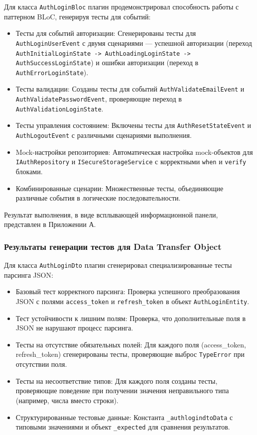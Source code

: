 \documentclass[14pt, russian]{scrartcl}
\begin{document}
Для класса \texttt{AuthLoginBloc} плагин продемонстрировал способность работы с паттерном BLoC, генерируя тесты для событий:

\begin{itemize}
    \item Тесты для событий авторизации: Сгенерированы тесты для \texttt{AuthLoginUserEvent} с двумя сценариями — успешной авторизации (переход \texttt{AuthInitialLoginState -> AuthLoadingLoginState -> AuthSuccessLoginState}) и ошибки авторизации (переход в \texttt{AuthErrorLoginState}).
    \item Тесты валидации: Созданы тесты для событий \texttt{AuthValidateEmailEvent} и \texttt{AuthValidatePasswordEvent}, проверяющие переход в \texttt{AuthValidationLoginState}.
    \item Тесты управления состоянием: Включены тесты для \texttt{AuthResetStateEvent} и \texttt{AuthLogoutEvent} с различными сценариями выполнения.
    \item Mock-настройки репозиториев: Автоматическая настройка mock-объектов для \texttt{IAuthRepository} и \texttt{ISecureStorageService} с корректными \texttt{when} и \texttt{verify} блоками.
    \item Комбинированные сценарии: Множественные тесты, объединяющие различные события в логические последовательности.
\end{itemize}

Результат выполнения, в виде всплывающей информационной панели, представлен в Приложении А.

\subsubsection{Результаты генерации тестов для Data Transfer Object}

Для класса \texttt{AuthLoginDto} плагин сгенерировал специализированные тесты парсинга JSON:

\begin{itemize}
    \item Базовый тест корректного парсинга: Проверка успешного преобразования JSON с полями \texttt{access\_token} и \texttt{refresh\_token} в объект \texttt{AuthLoginEntity}.
    \item Тест устойчивости к лишним полям: Проверка, что дополнительные поля в JSON не нарушают процесс парсинга.
    \item Тесты на отсутствие обязательных полей: Для каждого поля (access\_token, refresh\_token) сгенерированы тесты, проверяющие выброс \texttt{TypeError} при отсутствии поля.
    \item Тесты на несоответствие типов: Для каждого поля созданы тесты, проверяющие поведение при получении значения неправильного типа (например, числа вместо строки).
    \item Структурированные тестовые данные: Константа \texttt{\_authlogindtoData} с типовыми значениями и объект \texttt{\_expected} для сравнения результатов.
\end{itemize}
\end{document}
